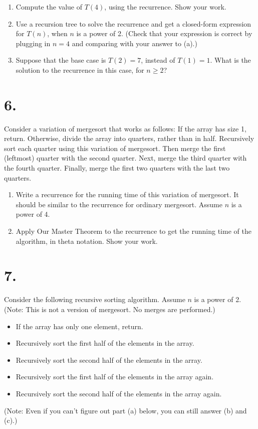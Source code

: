 \documentclass{article}
\begin{document}
\begin{enumerate}[label=(\alph*)]
    \item Compute the value of $T(4)$, using the recurrence. Show your work.
    \item Use a recursion tree to solve the recurrence and get a closed-form expression for $T(n)$, when $n$ is a power of 2. (Check that your expression is correct by plugging in $n = 4$ and comparing with your answer to (a).)
    \item Suppose that the base case is $T(2) = 7$, instead of $T(1) = 1$. What is the solution to the recurrence in this case, for $n \ge 2$?
\end{enumerate}



\section*{6.}
Consider a variation of mergesort that works as follows: If the array has size 1, return. Otherwise, divide the array into quarters, rather than in half. Recursively sort each quarter using this variation of mergesort. Then merge the first (leftmost) quarter with the second quarter. Next, merge the third quarter with the fourth quarter. Finally, merge the first two quarters with the last two quarters.

\begin{enumerate}[label=(\alph*)]
    \item Write a recurrence for the running time of this variation of mergesort. It should be similar to the recurrence for ordinary mergesort. Assume $n$ is a power of 4.
    \item Apply Our Master Theorem to the recurrence to get the running time of the algorithm, in theta notation. Show your work.
\end{enumerate}



\section*{7.}
Consider the following recursive sorting algorithm. Assume $n$ is a power of 2. (Note: This is not a version of mergesort. No merges are performed.)
\begin{itemize}
    \item If the array has only one element, return.
    \item Recursively sort the first half of the elements in the array.
    \item Recursively sort the second half of the elements in the array.
    \item Recursively sort the first half of the elements in the array again.
    \item Recursively sort the second half of the elements in the array again.
\end{itemize}
(Note: Even if you can’t figure out part (a) below, you can still answer (b) and (c).)
\end{document}
